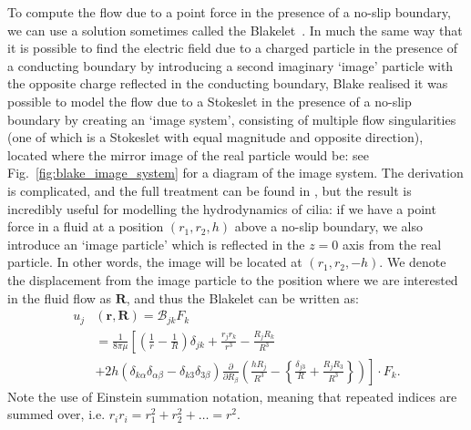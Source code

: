 To compute the flow due to a point force in the presence of a no-slip boundary, we can use a solution sometimes called the Blakelet~. In much the same way that it is possible to find the electric field due to a charged particle in the presence of a conducting boundary by introducing a second imaginary `image' particle with the opposite charge reflected in the conducting boundary, Blake realised it was possible to model the flow due to a Stokeslet in the presence of a no-slip boundary by creating an `image system', consisting of multiple flow singularities (one of which is a Stokeslet with equal magnitude and opposite direction), located where the mirror image of the real particle would be: see Fig.~\ref{fig:blake_image_system} for a diagram of the image system. The derivation is complicated, and the full treatment can be found in , but the result is incredibly useful for modelling the hydrodynamics of cilia: if we have a point force in a fluid at a position $(r_1, r_2, h)$ above a no-slip boundary, we also introduce an `image particle' which is reflected in the $z=0$ axis from the real particle. In other words, the image will be located at $(r_1, r_2, -h)$. We denote the displacement from the image particle to the position where we are interested in the fluid flow as $\mathbf{R}$, and thus the Blakelet can be written as:
\begin{align}
    u_j&(\mathbf{r}, \mathbf{R}) = \mathcal{B}_{jk} F_k \nonumber \\ 
    &= \frac{1}{8\pi\mu} \left[ \left( \frac{1}{r} - \frac{1}{R} \right) \delta_{jk} + \frac{r_j r_k}{r^3} - \frac{R_j R_k}{R^3} \right.\label{eq:blake} \\
    &+ \left. 2h\left( \delta_{k\alpha}\delta_{\alpha \beta} - \delta_{k3}\delta_{3\beta} \right) \frac{\partial}{\partial R_\beta} \left( \frac{h R_j}{R^3} - \left\{ \frac{\delta_{j3}}{R} + \frac{R_j R_3}{R^3} \right\} \right) \right] \cdot F_k.\nonumber
\end{align}
Note the use of Einstein summation notation, meaning that repeated indices are summed over, i.e. $r_i r_i = r_1^2 + r_2^2 + \dots = r^2$. 

